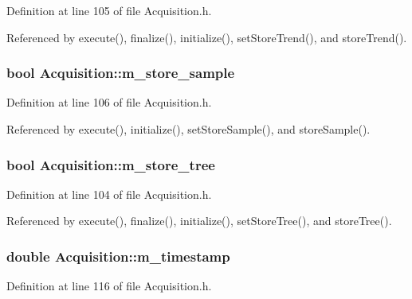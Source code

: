 Definition at line 105 of file Acquisition.h.

Referenced by execute(), finalize(), initialize(), setStoreTrend(), and storeTrend().\hypertarget{classAcquisition_a987cc1d04007cf1f5acc1accfd0909e5}{
\subsubsection[{m\_\-store\_\-sample}]{\setlength{\rightskip}{0pt plus 5cm}bool {\bf Acquisition::m\_\-store\_\-sample}}}
\label{classAcquisition_a987cc1d04007cf1f5acc1accfd0909e5}


Definition at line 106 of file Acquisition.h.

Referenced by execute(), initialize(), setStoreSample(), and storeSample().\hypertarget{classAcquisition_aca2143e9135e25554e58327475a767c5}{
\subsubsection[{m\_\-store\_\-tree}]{\setlength{\rightskip}{0pt plus 5cm}bool {\bf Acquisition::m\_\-store\_\-tree}}}
\label{classAcquisition_aca2143e9135e25554e58327475a767c5}


Definition at line 104 of file Acquisition.h.

Referenced by execute(), finalize(), initialize(), setStoreTree(), and storeTree().\hypertarget{classAcquisition_aa88cf8d27e075b5aaddb309dfb42cd04}{
\subsubsection[{m\_\-timestamp}]{\setlength{\rightskip}{0pt plus 5cm}double {\bf Acquisition::m\_\-timestamp}}}
\label{classAcquisition_aa88cf8d27e075b5aaddb309dfb42cd04}


Definition at line 116 of file Acquisition.h.


